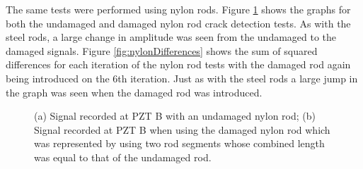The same tests were performed using nylon rods. Figure \ref{fig:nylonCrackResults} shows the graphs for both the undamaged and damaged nylon rod crack detection tests. As with the steel rods, a large change in amplitude was seen from the undamaged to the damaged signals. Figure \ref{fig:nylonDifferences} shows the sum of squared differences for each iteration of the nylon rod tests with the damaged rod again being introduced on the 6th iteration. Just as with the steel rods a large jump in the graph was seen when the damaged rod was introduced.

\begin{figure}[ht!]
\begin{subfigmatrix}{2}
\end{subfigmatrix}

  \caption
  { \label{fig:nylonCrackResults}
(a) Signal recorded at PZT B with an undamaged nylon rod;
(b) Signal recorded at PZT B when using the damaged nylon rod which was represented by using two rod segments whose combined length was equal to that of the undamaged rod.
}
\end{figure}

